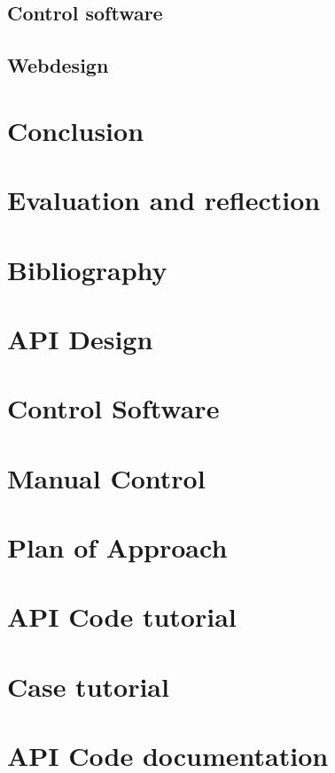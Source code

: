\documentclass[a4paper,oneside]{book}
\begin{document}
\section{Control software}
\section{Webdesign}

\chapter{Conclusion}
\chapter{Evaluation and reflection}
\chapter{Bibliography}



\appendix
\chapter{API Design}
\chapter{Control Software}
\chapter{Manual Control}
\chapter{Plan of Approach}
\label{app:plan-of-approach}
\chapter{API Code tutorial}
\chapter{Case tutorial}
\chapter{API Code documentation}
\end{document}
